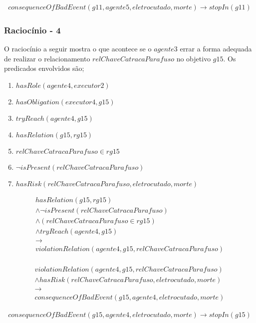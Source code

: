 \begin{eqnarray}
	consequenceOfBadEvent(g11,agente5,eletrocutado,morte) \to stopIn(g11)
\end{eqnarray}
\subsubsection{Raciocínio - 4} 
\label{raciocinio4}
O raciocínio a seguir mostra o que acontece se o $agente3$ errar a forma adequada de realizar o relacionamento $relChaveCatracaParafuso$ no objetivo $g15$. Os predicados envolvidos são;

\begin{enumerate}
	\item $hasRole(agente4,executor2)$
	\item $hasObligation(executor4,g15)$	
	\item $tryReach(agente4,g15)$ 
	\item $hasRelation(g15,rg15)$
	\item $relChaveCatracaParafuso \in rg15$	
	\item $\neg isPresent(relChaveCatracaParafuso)$
	\item $hasRisk(relChaveCatracaParafuso,eletrocutado,morte)$
\end{enumerate}

\begin{eqnarray}
	hasRelation(g15,rg15) \nonumber \\
	\wedge \neg isPresent(relChaveCatracaParafuso)  \nonumber \\ 
	\wedge (relChaveCatracaParafuso \in rg15) \nonumber \\
	\wedge tryReach(agente4,g15) \nonumber \\ 
	\to \nonumber \\ 
	violationRelation(agente4,g15,relChaveCatracaParafuso) \nonumber \\
\end{eqnarray}

\begin{eqnarray}\nonumber
	violationRelation(agente4,g15,relChaveCatracaParafuso) \nonumber \\ 
	 \wedge hasRisk(relChaveCatracaParafuso,eletrocutado,morte) \nonumber \\ 
	\to \nonumber \\ 
	consequenceOfBadEvent(g15,agente4,eletrocutado,morte)
\end{eqnarray}

\begin{eqnarray}
	consequenceOfBadEvent(g15,agente4,eletrocutado,morte) \to stopIn(g15)
\end{eqnarray}

